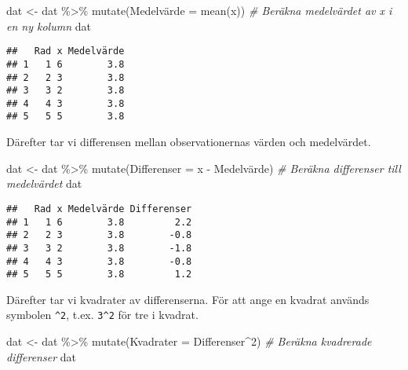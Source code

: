 \documentclass[
]{book}
\newenvironment{Shaded}{\begin{snugshade}}{\end{snugshade}}
\newcommand{\AttributeTok}[1]{\textcolor[rgb]{0.77,0.63,0.00}{#1}}
\newcommand{\CommentTok}[1]{\textcolor[rgb]{0.56,0.35,0.01}{\textit{#1}}}
\newcommand{\DecValTok}[1]{\textcolor[rgb]{0.00,0.00,0.81}{#1}}
\newcommand{\FunctionTok}[1]{\textcolor[rgb]{0.00,0.00,0.00}{#1}}
\newcommand{\NormalTok}[1]{#1}
\newcommand{\OtherTok}[1]{\textcolor[rgb]{0.56,0.35,0.01}{#1}}
\newcommand{\SpecialCharTok}[1]{\textcolor[rgb]{0.00,0.00,0.00}{#1}}
\theoremstyle{definition}
\theoremstyle{definition}
\theoremstyle{definition}
\theoremstyle{definition}
\theoremstyle{remark}
\begin{document}
\begin{Shaded}
\begin{Highlighting}[]
\NormalTok{dat }\OtherTok{\textless{}{-}}\NormalTok{ dat }\SpecialCharTok{\%\textgreater{}\%} 
  \FunctionTok{mutate}\NormalTok{(Medelvärde }\OtherTok{=} \FunctionTok{mean}\NormalTok{(x))                   }\CommentTok{\# Beräkna medelvärdet av x i en ny kolumn}
\NormalTok{dat}
\end{Highlighting}
\end{Shaded}

\begin{verbatim}
##   Rad x Medelvärde
## 1   1 6        3.8
## 2   2 3        3.8
## 3   3 2        3.8
## 4   4 3        3.8
## 5   5 5        3.8
\end{verbatim}

Därefter tar vi differensen mellan observationernas värden och medelvärdet.

\begin{Shaded}
\begin{Highlighting}[]
\NormalTok{dat }\OtherTok{\textless{}{-}}\NormalTok{ dat }\SpecialCharTok{\%\textgreater{}\%} 
  \FunctionTok{mutate}\NormalTok{(}\AttributeTok{Differenser =}\NormalTok{ x }\SpecialCharTok{{-}}\NormalTok{ Medelvärde)           }\CommentTok{\# Beräkna differenser till medelvärdet}
\NormalTok{dat}
\end{Highlighting}
\end{Shaded}

\begin{verbatim}
##   Rad x Medelvärde Differenser
## 1   1 6        3.8         2.2
## 2   2 3        3.8        -0.8
## 3   3 2        3.8        -1.8
## 4   4 3        3.8        -0.8
## 5   5 5        3.8         1.2
\end{verbatim}

Därefter tar vi kvadrater av differenserna. För att ange en kvadrat används symbolen \texttt{\^{}2}, t.ex. \texttt{3\^{}2} för tre i kvadrat.

\begin{Shaded}
\begin{Highlighting}[]
\NormalTok{dat }\OtherTok{\textless{}{-}}\NormalTok{ dat }\SpecialCharTok{\%\textgreater{}\%} 
  \FunctionTok{mutate}\NormalTok{(}\AttributeTok{Kvadrater =}\NormalTok{ Differenser}\SpecialCharTok{\^{}}\DecValTok{2}\NormalTok{)              }\CommentTok{\# Beräkna kvadrerade differenser}
\NormalTok{dat}
\end{Highlighting}
\end{Shaded}
\end{document}
